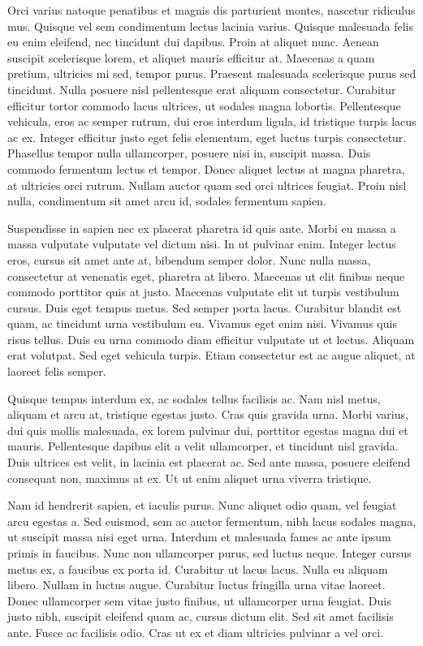 \documentclass[a4paper,12pt]{article} %
\begin{document}
Orci varius natoque penatibus et magnis dis parturient montes, nascetur ridiculus mus. Quisque vel sem condimentum lectus lacinia varius. Quisque malesuada felis eu enim eleifend, nec tincidunt dui dapibus. Proin at aliquet nunc. Aenean suscipit scelerisque lorem, et aliquet mauris efficitur at. Maecenas a quam pretium, ultricies mi sed, tempor purus. Praesent malesuada scelerisque purus sed tincidunt. Nulla posuere nisl pellentesque erat aliquam consectetur. Curabitur efficitur tortor commodo lacus ultrices, ut sodales magna lobortis. Pellentesque vehicula, eros ac semper rutrum, dui eros interdum ligula, id tristique turpis lacus ac ex. Integer efficitur justo eget felis elementum, eget luctus turpis consectetur. Phasellus tempor nulla ullamcorper, posuere nisi in, suscipit massa. Duis commodo fermentum lectus et tempor. Donec aliquet lectus at magna pharetra, at ultricies orci rutrum. Nullam auctor quam sed orci ultrices feugiat. Proin nisl nulla, condimentum sit amet arcu id, sodales fermentum sapien.

Suspendisse in sapien nec ex placerat pharetra id quis ante. Morbi eu massa a massa vulputate vulputate vel dictum nisi. In ut pulvinar enim. Integer lectus eros, cursus sit amet ante at, bibendum semper dolor. Nunc nulla massa, consectetur at venenatis eget, pharetra at libero. Maecenas ut elit finibus neque commodo porttitor quis at justo. Maecenas vulputate elit ut turpis vestibulum cursus. Duis eget tempus metus. Sed semper porta lacus. Curabitur blandit est quam, ac tincidunt urna vestibulum eu. Vivamus eget enim nisi. Vivamus quis risus tellus. Duis eu urna commodo diam efficitur vulputate ut et lectus. Aliquam erat volutpat. Sed eget vehicula turpis. Etiam consectetur est ac augue aliquet, at laoreet felis semper.

Quisque tempus interdum ex, ac sodales tellus facilisis ac. Nam nisl metus, aliquam et arcu at, tristique egestas justo. Cras quis gravida urna. Morbi varius, dui quis mollis malesuada, ex lorem pulvinar dui, porttitor egestas magna dui et mauris. Pellentesque dapibus elit a velit ullamcorper, et tincidunt nisl gravida. Duis ultrices est velit, in lacinia est placerat ac. Sed ante massa, posuere eleifend consequat non, maximus at ex. Ut ut enim aliquet urna viverra tristique.

Nam id hendrerit sapien, et iaculis purus. Nunc aliquet odio quam, vel feugiat arcu egestas a. Sed euismod, sem ac auctor fermentum, nibh lacus sodales magna, ut suscipit massa nisi eget urna. Interdum et malesuada fames ac ante ipsum primis in faucibus. Nunc non ullamcorper purus, sed luctus neque. Integer cursus metus ex, a faucibus ex porta id. Curabitur ut lacus lacus. Nulla eu aliquam libero. Nullam in luctus augue. Curabitur luctus fringilla urna vitae laoreet. Donec ullamcorper sem vitae justo finibus, ut ullamcorper urna feugiat. Duis justo nibh, suscipit eleifend quam ac, cursus dictum elit. Sed sit amet facilisis ante. Fusce ac facilisis odio. Cras ut ex et diam ultricies pulvinar a vel orci.
\end{document}
